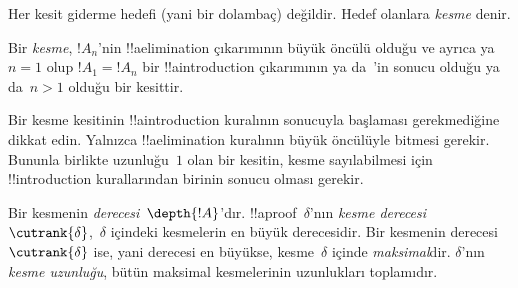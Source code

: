 Her kesit giderme hedefi (yani bir dolambaç) değildir. Hedef olanlara
\emph{kesme} denir.

\begin{defn}
Bir \emph{kesme}, $!A_n$'nin !!a{elimination} çıkarımının büyük öncülü
olduğu ve ayrıca ya $n=1$ olup $!A_1 = !A_n$ bir !!a{introduction}
çıkarımının ya da~\FalseInt'in sonucu olduğu ya da~$n>1$ olduğu bir
kesittir.
\end{defn}

Bir kesme kesitinin !!a{introduction} kuralının sonucuyla başlaması
gerekmediğine dikkat edin. Yalnızca !!a{elimination} kuralının büyük
öncülüyle bitmesi gerekir. Bununla birlikte uzunluğu~$1$ olan bir kesitin,
kesme sayılabilmesi için !!{introduction} kurallarından birinin sonucu
olması gerekir.

\begin{defn}
Bir kesmenin \emph{derecesi}~$\depth{!A}$'dır. !!a{proof}~$\delta$'nın
\emph{kesme derecesi}~$\cutrank{\delta}$,~$\delta$ içindeki kesmelerin en
büyük derecesidir. Bir kesmenin derecesi~$\cutrank{\delta}$ ise, yani
derecesi en büyükse, kesme~$\delta$ içinde \emph{maksimal}dir.
$\delta$'nın \emph{kesme uzunluğu}, bütün maksimal kesmelerinin
uzunlukları toplamıdır.
\end{defn}

